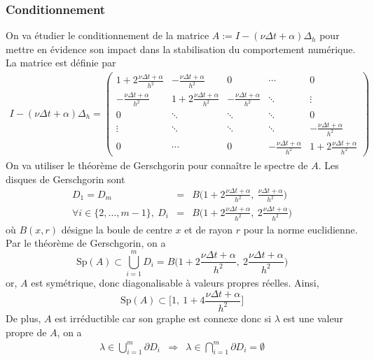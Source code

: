 \subsubsection{Conditionnement}
On va étudier le conditionnement de la matrice $A:=I-(\nu\Delta t+\alpha)\Delta_h$ pour mettre en évidence son impact dans la stabilisation du comportement numérique. La matrice est définie par
\begin{eqnarray*}
    I - (\nu\Delta t +\alpha)\Delta_h = \begin{pmatrix}
        1+2\frac{\nu \Delta t+\alpha}{h^2} & -\frac{\nu\Delta t + \alpha}{h^2} & 0  & \cdots & 0 \\
       -\frac{\nu\Delta t + \alpha}{h^2} & 1+2\frac{\nu \Delta t+\alpha}{h^2} & -\frac{\nu\Delta t + \alpha}{h^2}  & \ddots & \vdots \\
        0 & \ddots & \ddots & \ddots &  0 \\
        \vdots & \ddots & \ddots & \ddots &  -\frac{\nu\Delta t + \alpha}{h^2} \\
        0 & \cdots &  0 & -\frac{\nu\Delta t + \alpha}{h^2} & 1+2\frac{\nu \Delta t+\alpha}{h^2}
    \end{pmatrix}
\end{eqnarray*}
On va utiliser le théorème de Gerschgorin pour connaître le spectre de $A$. Les disques de Gerschgorin sont 
\begin{eqnarray*}
    D_1 = D_m &=& B\bigg(1+2\frac{\nu\Delta t+\alpha}{h^2}, \ \frac{\nu\Delta t+\alpha}{h^2}\bigg) \\
    \forall i \in \{2,\dots,m-1\}, \ D_i &=& B\bigg(1+2\frac{\nu\Delta t+\alpha}{h^2}, \ 2\frac{\nu\Delta t+\alpha}{h^2}\bigg)
\end{eqnarray*}
où $B(x, r)$ désigne la boule de centre $x$ et de rayon $r$ pour la norme euclidienne. Par le théorème de Gerschgorin, on a 
\begin{equation*}
    \mathrm{Sp}(A) \subset \bigcup_{i=1}^m D_i = B\bigg(1+2\frac{\nu\Delta t+\alpha}{h^2}, \ 2\frac{\nu\Delta t+\alpha}{h^2}\bigg)
\end{equation*}
or, $A$ est symétrique, donc diagonalisable à valeurs propres réelles. Ainsi, 
\begin{equation*}
    \mathrm{Sp}(A) \subset  \Big[1, \ 1+4\frac{\nu\Delta t+\alpha}{h^2}\Big]
\end{equation*}
De plus, $A$ est irréductible car son graphe est connexe donc si $\lambda$ est une valeur propre de $A$, on a 
\begin{eqnarray*}
    \lambda \in \bigcup_{i=1}^m \partial D_i &\Longrightarrow& \lambda \in 
    \bigcap_{i=1}^m \partial D_i = \emptyset
\end{eqnarray*}
